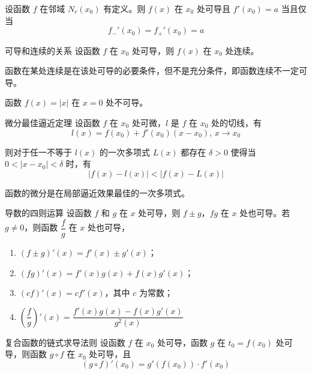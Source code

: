 \begin{proposition}
  设函数 $f$ 在邻域 $N_r(x_0)$ 有定义。则 $f(x)$ 在 $x_0$ 处可导且 $f'(x_0) = a$ 当且仅当
  \[f_{-}'(x_0) = f_{+}'(x_0) = a\]
\end{proposition}

\begin{theorem}{可导和连续的关系}
  设函数 $f$ 在 $x_0$ 处可导，则 $f(x)$ 在 $x_0$ 处连续。
\end{theorem}
\begin{remark}
  函数在某处连续是在该处可导的必要条件，但不是充分条件，即函数连续不一定可导。
\end{remark}

\hfill

\begin{example}
  函数 $f(x) = |x|$ 在 $x = 0$ 处不可导。
\end{example}

\hfill

\begin{theorem}{微分最佳逼近定理}
  设函数 $f$ 在 $x_0$ 处可微，$l$ 是 $f$ 在 $x_0$ 处的切线，有
  \[l(x) = f(x_0) + f'(x_0)(x - x_0),\, x\to x_0\]

  则对于任一不等于 $l(x)$ 的一次多项式 $L(x)$ 都存在 $\delta > 0$ 使得当 $0 < |x - x_0| < \delta$ 时，有
  \[|f(x) - l(x)| < |f(x) - L(x)|\]
\end{theorem}
函数的微分是在局部逼近效果最佳的一次多项式。

\begin{theorem}{导数的四则运算}
  设函数 $f$ 和 $g$ 在 $x$ 处可导，则 $f \pm g$，$fg$ 在 $x$ 处也可导。若 $g \ne 0$，则函数 $\dfrac{f}{g}$ 在 $x$ 处也可导，
  \begin{enumerate}
    \item $(f \pm g)'(x) = f'(x) \pm g'(x)$；
    \item $(fg)'(x) = f'(x)g(x) + f(x)g'(x)$；
    \item $(cf)'(x) = cf'(x)$，其中 $c$ 为常数；
    \item $\left(\dfrac{f}{g}\right)'(x) = \dfrac{f'(x)g(x) - f(x)g'(x)}{g^2(x)}$
  \end{enumerate}
\end{theorem}

\begin{theorem}{复合函数的链式求导法则}
  设函数 $f$ 在 $x_0$ 处可导，函数 $g$ 在 $t_0 = f(x_0)$ 处可导，则函数 $g \circ f$ 在 $x_0$ 处可导，且
  \[(g \circ f)'(x_0) = g'(f(x_0)) \cdot f'(x_0)\]
\end{theorem}

